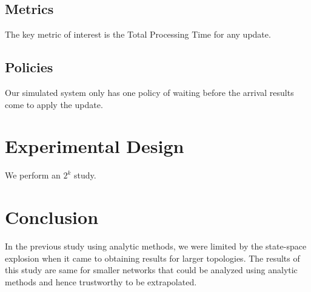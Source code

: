 \documentclass[conference]{IEEEtran}
\begin{document}
\subsection{Metrics}
The key metric of interest is the Total Processing Time for any update.

\subsection{Policies}
Our simulated system only has one policy of waiting before the arrival results come to apply the update. 

\section{Experimental Design}
We perform an $2^k$ study.

\section{Conclusion}
In the previous study using analytic methods, we were limited by the state-space explosion when it came to obtaining results for larger topologies. The results of this study are same for smaller networks that could be analyzed using analytic methods and hence trustworthy to be extrapolated. 
\end{document}

